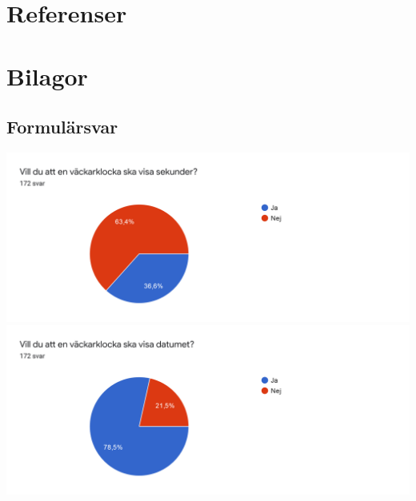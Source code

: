 \documentclass[12pt, a4paper,titlepage]{article}
\begin{document}
    
    \section{Referenser}
    
    \newpage
    \section{Bilagor}
        \subsection{Formulärsvar}
            \label{sec:svar}
            \includegraphics[scale=0.35]{fraga1.png}
            \includegraphics[scale=0.35]{fraga2.png}
\end{document}
